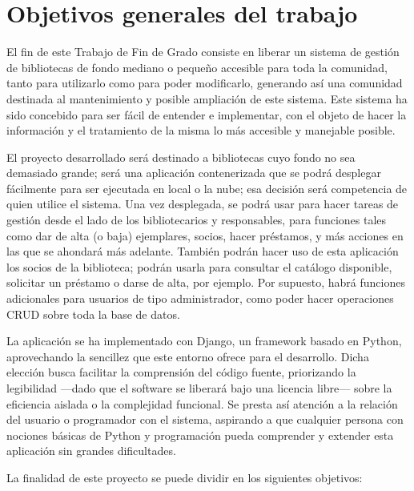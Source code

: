 \section{Objetivos generales del trabajo}

El fin de este Trabajo de Fin de Grado consiste en liberar un sistema de gestión de bibliotecas de fondo mediano o pequeño accesible para toda la comunidad, tanto para utilizarlo como para poder modificarlo, generando así una comunidad destinada al mantenimiento y posible ampliación de este sistema.  Este sistema ha sido concebido para ser fácil de entender e implementar, con el objeto de hacer la información y el tratamiento de la misma lo más accesible y manejable posible.

El proyecto desarrollado será destinado a bibliotecas cuyo fondo no sea demasiado grande; será una aplicación contenerizada que se podrá desplegar fácilmente para ser ejecutada en local o la nube; esa decisión será competencia de quien utilice el sistema. Una vez desplegada, se podrá usar para hacer tareas de gestión desde el lado de los bibliotecarios y responsables, para funciones tales como dar de alta (o baja) ejemplares, socios, hacer préstamos, y más acciones en las que se ahondará más adelante. También podrán hacer uso de esta aplicación los socios de la biblioteca; podrán usarla para consultar el catálogo disponible, solicitar un préstamo o darse de alta, por ejemplo. Por supuesto, habrá funciones adicionales para usuarios de tipo administrador, como poder hacer operaciones CRUD sobre toda la base de datos.

La aplicación se ha implementado con Django, un framework basado en Python, aprovechando la sencillez que este entorno ofrece para el desarrollo. Dicha elección busca facilitar la comprensión del código fuente, priorizando la legibilidad —dado que el software se liberará bajo una licencia libre— sobre la eficiencia aislada o la complejidad funcional. Se presta así atención a la relación del usuario o programador con el sistema, aspirando a que cualquier persona con nociones básicas de Python y programación pueda comprender y extender esta aplicación sin grandes dificultades.

La finalidad de este proyecto se puede dividir en los siguientes objetivos:

